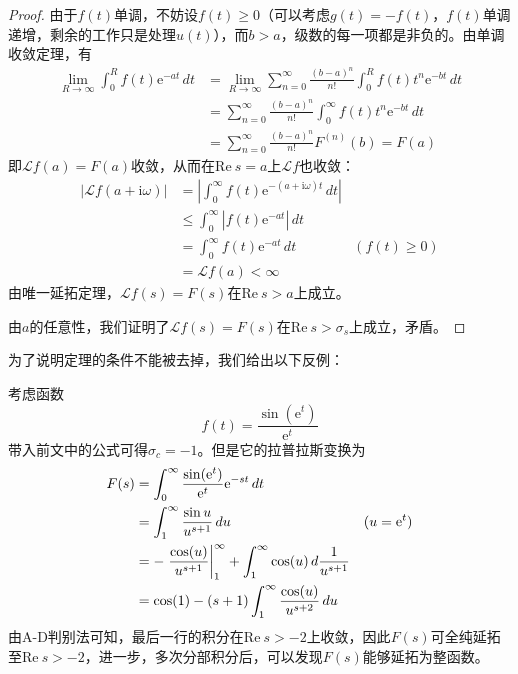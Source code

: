 \begin{proof}
    由于$f(t)$单调，不妨设$f(t)\geq 0$（可以考虑$g(t)=-f(t)$，$f(t)$单调递增，剩余的工作只是处理$u(t)$），而$b>a$，级数的每一项都是非负的。由单调收敛定理，有
    \begin{align*}
        \lim_{R\to\infty}\int_{0}^{R}f(t)\mathrm{e}^{-a t}\,dt&=\lim_{R\to\infty}\sum_{n=0}^{\infty}\frac{(b-a)^n}{n!}\int_{0}^{R}f(t)t^n \mathrm{e}^{-b t}\,dt\\
        &=\sum_{n=0}^{\infty}\frac{(b-a)^n}{n!}\int_{0}^{\infty}f(t)t^n \mathrm{e}^{-b t}\,dt\\
        &=\sum_{n=0}^{\infty}\frac{(b-a)^n}{n!}F^{(n)}(b)=F(a)
    \end{align*}
    即$\mathcal{L} f(a)=F(a)$收敛，从而在$\text{Re}\ s=a$上$\mathcal{L} f$也收敛：\begin{align*}
        |\mathcal{L} f(a+\mathrm{i}\omega)|&=\left|\int_{0}^{\infty}f(t)\mathrm{e}^{-(a+\mathrm{i}\omega) t}\,dt\right|\\
        &\leq \int_{0}^{\infty}\left|f(t)\mathrm{e}^{-a t}\right|\,dt\\
        &=\int_{0}^{\infty}f(t)\mathrm{e}^{-a t}\,dt&\left(f(t)\geq 0\right)\\
        &=\mathcal{L}f(a)<\infty
    \end{align*}
    由唯一延拓定理，$\mathcal{L} f(s)=F(s)$在$\text{Re}\ s>a$上成立。

    由$a$的任意性，我们证明了$\mathcal{L} f(s)=F(s)$在$\text{Re}\ s>\sigma_s$上成立，矛盾。
\end{proof}

为了说明定理的条件不能被去掉，我们给出以下反例\cite{Laplace_Transform}：
\begin{example}
    考虑函数
    \[f(t)=\frac{\sin(\mathrm{e}^t)}{\mathrm{e}^t}\]
    带入前文中的公式可得$\sigma_c=-1$。但是它的拉普拉斯变换为
    \begin{align*}
        F(s)&=\int_{0}^{\infty}\frac{\sin(\mathrm{e}^t)}{\mathrm{e}^t}\mathrm{e}^{-s t}\,dt\\
        &=\int_{1}^{\infty}\frac{\sin u}{u^{s+1}}\,du&(u=\mathrm{e}^t)\\
        &=-\left.\frac{\cos(u)}{u^{s+1}}\right|_{1}^{\infty}+\int_{1}^{\infty}\cos(u)\,d\frac{1}{u^{s+1}}\\
        &=\cos(1)-(s+1)\int_{1}^{\infty}\frac{\cos(u)}{u^{s+2}}\,du
    \end{align*}
    由A-D判别法可知，最后一行的积分在$\text{Re}\ s>-2$上收敛，因此$F(s)$可全纯延拓至$\text{Re}\ s>-2$，进一步，多次分部积分后，可以发现$F(s)$能够延拓为整函数。
\end{example}

